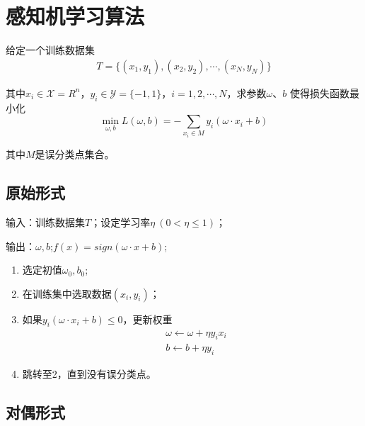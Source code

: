 \section{感知机学习算法}

给定一个训练数据集
\begin{eqnarray}
    T=\{(x_1,y_1),(x_2,y_2),\cdots,(x_N,y_N)\}
\end{eqnarray}

其中$x_i\in \mathcal{X}=R^n$，$y_i\in\mathcal{Y}=\{-1,1\}$，$i=1,2,\cdots,N$，求参数$\omega$、$b$
使得损失函数最小化
\begin{equation}
    \min\limits_{\omega,b}L(\omega,b)=-\sum_{x_i\in M}y_i(\omega\cdot x_i+b)
\end{equation}

其中$M$是误分类点集合。

\subsection*{原始形式}

\begin{framed}
输入：训练数据集$T$；设定学习率$\eta\ (0<\eta\leqslant 1)$；

输出：$\omega,b$;$f(x)=sign(\omega\cdot x+b)$;

\begin{enumerate}[itemindent=1em]
    \item 选定初值$\omega_0,b_0$;
    \item 在训练集中选取数据$(x_i,y_i)$；
    \item 如果$y_i(\omega\cdot x_i+b)\leqslant 0$，更新权重
    \begin{equation}
        \begin{aligned}
            & \omega\leftarrow \omega+\eta y_ix_i\\
            & b \leftarrow b+\eta y_i
        \end{aligned}
    \end{equation}
    \item 跳转至2，直到没有误分类点。
\end{enumerate}
\end{framed}

\subsection*{对偶形式}

